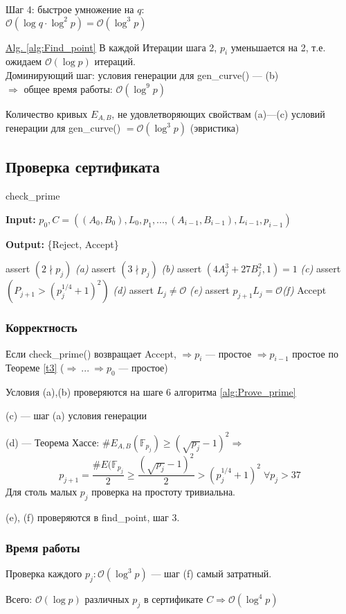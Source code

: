 \documentclass[12pt]{article}
\newcommand{\F}{{{\mathbb F}}}
\newcommand{\bigO}{\mathcal{O}}
\theoremstyle{definition}
\theoremstyle{definition}
\theoremstyle{definition}
\begin{document}
Шаг 4: быстрое умножение на $q$:\\
$\bigO(\log q \cdot \log^2 p) = \bigO(\log^3 p)$

\underline{Alg. \ref{alg:Find_point}} В каждой Итерации шага 2, $p_i$ уменьшается на 2, т.е. ожидаем $\bigO(\log p)$ итераций.\\
Доминирующий шаг: условия генерации для gen\_curve() — (b)\\
$\Rightarrow $ общее время работы: $\bigO(\log^9 p)$

Количество кривых $E_{A,B}$, не удовлетворяющих свойствам (a)—(c) условий генерации для gen\_curve() $= \bigO(\log^3 p)$ (эвристика)

\subsection{Проверка сертификата}

\begin{algorithm}[H]
	\caption{check\_prime}
	\label{alg:check_prime}
    \textbf{Input:} $p_0, C =((A_0, B_0), L_0, p_1, ..., (A_{i-1}, B_{i-1}), L_{i-1}, p_{i-1})$
    
    \textbf{Output:} \{Reject, Accept\}

	\begin{algorithmic}[1]
            \State assert $(2 \nmid p_j)$ \textit{(a)}
            \State assert $(3 \nmid p_j)$ \textit{(b)}
            \State assert $(4A^3_j + 27B_j^2, 1) = 1$ \textit{(c)}
            \State assert $(P_{j+1} > (p_j^{1/4} + 1)^2)$ \textit{(d)}
            \State assert $L_j \neq \bigO$ \textit{(e)}
            \State assert $p_{j+1}L_j = \bigO$\textit{(f)}
		\EndFor
		\State \Return Accept
	\end{algorithmic}
\end{algorithm}

\subsubsection{Корректность}
Если check\_prime() возвращает Accept, $\Rightarrow p_i$ — простое $\Rightarrow p_{i-1}$ простое по Теореме \ref{t3} ($\Rightarrow\ ...\ \Rightarrow p_0$ — простое)

Условия (a),(b) проверяются на шаге 6 алгоритма \ref{alg:Prove_prime}

(c) — шаг (a) условия генерации

(d) — Теорема Хассе: $\#E_{A,B}(\F_{p_j}) \geq (\sqrt{p_j} - 1)^2 \Rightarrow$
\[
    p_{j+1} = \frac{\#E(\F_{p_j}}{2} \geq \frac{(\sqrt{p_j} - 1)^2}{2} > (p_j^{1/4} + 1)^2\; \forall p_j > 37
\]
Для столь малых $p_j$ проверка на простоту тривиальна.

(e), (f) проверяются в find\_point, шаг 3.

\subsubsection{Время работы}
Проверка каждого $p_j: \bigO(\log^3 p)$ — шаг (f) самый затратный.

Всего: $\bigO(\log p)$ различных $p_j$ в сертификате $C \Rightarrow \bigO(\log^4 p)$
\end{document}
